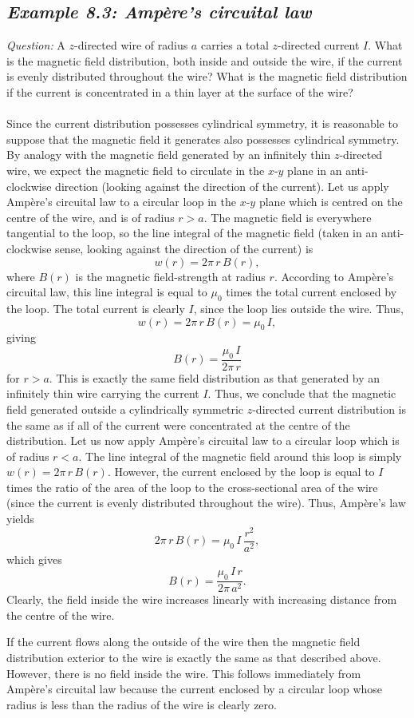 \subsection*{\em Example 8.3: Amp\`{e}re's circuital law}
{\em Question:} A $z$-directed wire of radius $a$ carries a total
$z$-directed current $I$.
What is the magnetic field distribution, both inside and outside the wire, if the current
is evenly distributed throughout the wire? What is the magnetic field 
distribution if the current is
concentrated in a thin layer at the surface of the wire?\\
~\\
 Since the current distribution possesses 
cylindrical symmetry, it is reasonable to suppose that the magnetic field
it generates also possesses cylindrical symmetry. By analogy with the magnetic
field generated by an infinitely thin $z$-directed wire, we expect the
magnetic field to circulate in the $x$-$y$ plane in an anti-clockwise direction
(looking against the direction of the current). Let us apply Amp\`{e}re's circuital
law to a circular loop in the $x$-$y$ plane which is centred on the centre of
the wire, and is of radius $r>a$. The magnetic field is everywhere tangential
to the loop, so the line integral of the magnetic field (taken
in an anti-clockwise sense, looking against the direction of the current) is
$$
w(r) = 2\pi \,r\,B(r),
$$
where $B(r)$ is the magnetic field-strength at radius $r$. According to Amp\`{e}re's
circuital law, this line integral is equal to $\mu_0$ times the total current enclosed by
the loop. The total current is clearly $I$, since the loop lies outside the wire.
Thus,
$$
w(r) = 2\pi \,r\,B(r) = \mu_0\,I,
$$
giving
$$
B(r) = \frac{\mu_0\,I}{2\pi\,r}
$$
for $r>a$. This is exactly the same field distribution as that generated by an
infinitely thin wire carrying the current $I$. Thus, we conclude that the magnetic field generated outside
a cylindrically symmetric $z$-directed current distribution is the same as if all of the
current were concentrated at the centre of the distribution. 
Let us now apply  Amp\`{e}re's circuital
law to a circular loop which  is of radius $r<a$. The line integral
of the magnetic field around this loop is simply $w(r) = 2\pi \,r\,B(r)$.
However, the current enclosed by the loop is equal to $I$ times the ratio of
the area of the loop to the cross-sectional area of the wire (since the
current is evenly distributed throughout the wire). Thus,  Amp\`{e}re's 
law yields
$$
2\pi \,r\,B(r) = \mu_0\,I\,\frac{r^2}{a^2},
$$
which gives
$$
B(r) = \frac{\mu_0\,I\,r}{2\pi\,a^2}.
$$
Clearly, the field inside the wire increases linearly with increasing distance
from the centre of the wire.

If the current flows along the outside of the wire then the magnetic
field distribution exterior to the wire is exactly the same as that
described above. However, there is no field inside the wire. This
follows immediately from Amp\`{e}re's circuital
law because the current enclosed by a circular loop whose radius is less than
the radius of the wire is clearly zero.
